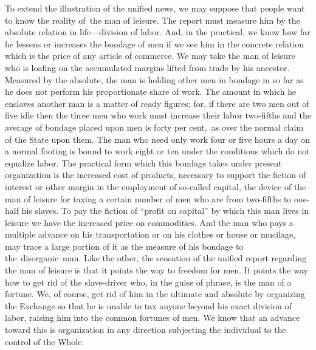 \documentclass[openany,nobib]{tufte-book}
\begin{document}
To extend the illustration of the unified news, we may suppose that
people want to know the reality of~the man of leisure. The report must
measure him by the absolute relation in life---division of labor. And,
in the practical, we know how far he lessens or increases the bondage of
men if we see him in the concrete relation which is the price of any
article of commerce. We may take the man of leisure who is loafing on
the accumulated margins lifted from trade by his ancestor. Measured by
the absolute, the man is holding other men in bondage in so far as he
does not perform his proportionate share of work. The amount in which he
enslaves another man is a matter of ready figures; for, if there are two
men out of five idle then the three men who work must increase their
labor two-fifths and the average of bondage placed upon men is forty per
cent,~as over the normal claim of the State upon them. The man who need
only work four or five hours a day on a normal footing is bound to work
eight or ten under the conditions which do not equalize labor. The
practical form which this bondage takes under present organization is
the increased cost of products, necessary to support the fiction of
interest or other margin in the employment of so-called capital, the
device of the man of leisure for taxing a certain number of men who are
from two-fifths to one-half his slaves. To pay the fiction of ``profit
on capital'' by which this man lives in leisure we have the increased
price on commodities. And the man who pays a multiple advance on his
transportation or on his clothes or house or mucilage, may trace a large
portion of it as the measure of his bondage to the~disorganic~man. Like
the other, the sensation of the unified report regarding the man of
leisure is that it points the way to freedom for men. It points the way
how to get rid of the slave-driver who, in the guise of phrase, is the
man of a fortune. We, of course, get rid of him in the ultimate and
absolute by organizing the Exchange so that he is unable to tax anyone
beyond his exact division of labor, raising him into the common fortunes
of men. We know that an advance toward this is organization in any
direction subjecting the individual to the control of the Whole.~
\end{document}
